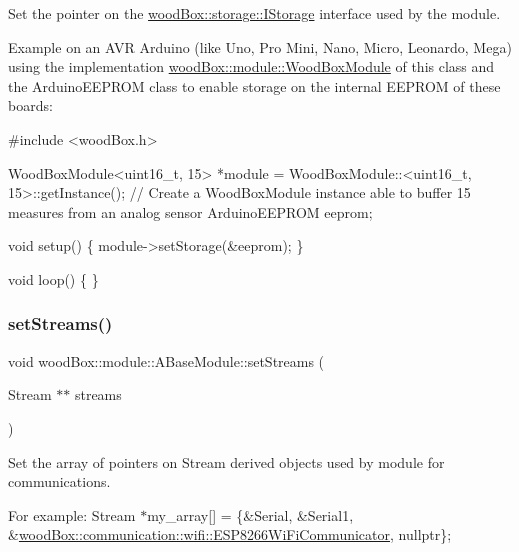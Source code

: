 Set the pointer on the \mbox{\hyperlink{classwood_box_1_1storage_1_1_i_storage}{wood\+Box\+::storage\+::\+I\+Storage}} interface used by the module.

Example on an A\+VR Arduino (like Uno, Pro Mini, Nano, Micro, Leonardo, Mega) using the implementation \mbox{\hyperlink{classwood_box_1_1module_1_1_wood_box_module}{wood\+Box\+::module\+::\+Wood\+Box\+Module}} of this class and the Arduino\+E\+E\+P\+R\+OM class to enable storage on the internal E\+E\+P\+R\+OM of these boards\+:


\begin{DoxyCode}
\textcolor{preprocessor}{#include <woodBox.h>}

WoodBoxModule<uint16\_t, 15> *module = WoodBoxModule::<uint16\_t, 15>::getInstance(); \textcolor{comment}{// Create a
       WoodBoxModule instance able to buffer 15 measures from an analog sensor}
ArduinoEEPROM eeprom;

\textcolor{keywordtype}{void} setup() \{
  module->setStorage(&eeprom);
\}

\textcolor{keywordtype}{void} loop() \{
\}
\end{DoxyCode}
 \mbox{\label{classwood_box_1_1module_1_1_a_base_module_a6e3b73bd36f668f5d621dee3070c131a}} 
\subsubsection{\texorpdfstring{set\+Streams()}{setStreams()}}
{\footnotesize\ttfamily void wood\+Box\+::module\+::\+A\+Base\+Module\+::set\+Streams (\begin{DoxyParamCaption}\item[{Stream $\ast$$\ast$}]{streams }\end{DoxyParamCaption})}

Set the array of pointers on Stream derived objects used by module for communications.

For example\+: {\ttfamily Stream $\ast$my\+\_\+array\mbox{[}\mbox{]} = \{\&Serial, \&Serial1, \&\mbox{\hyperlink{classwood_box_1_1communication_1_1wifi_1_1_e_s_p8266_wi_fi_communicator}{wood\+Box\+::communication\+::wifi\+::\+E\+S\+P8266\+Wi\+Fi\+Communicator}}, nullptr\};}

